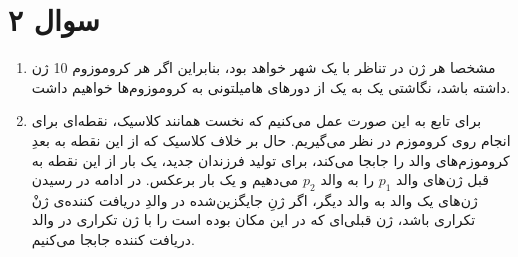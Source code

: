 \documentclass[a4paper, 12pt]{article}
\begin{document}
\section*{سوال ۲}
\begin{enumerate}[آ)]
	\item
	مشخصا هر ژن در تناظر با یک شهر خواهد بود، بنابراین اگر هر کروموزوم 10 ژن داشته باشد، نگاشتی یک به یک از دورهای هامیلتونی به کروموزوم‌ها خواهیم داشت.
	\item {}
	برای تابع  به این صورت عمل می‌کنیم که نخست همانند  کلاسیک، نقطه‌ای برای انجام  روی کروموزم در نظر می‌گیریم. حال بر خلاف  کلاسیک که از این نقطه به بعدِ کروموزم‌های والد را جابجا می‌کند، برای تولید فرزندان جدید، یک بار از این نقطه به قبل ژن‌های والد $p_1$ را به والد $p_2$ می‌دهیم و یک بار برعکس. در ادامه در رسیدن ژن‌های یک والد به والد دیگر، اگر ژنِ جایگزین‌شده در والدِ دریافت کننده‌ی ژنْ تکراری باشد، ژن قبلی‌ای که در این مکان بوده است را با ژن تکراری در والد دریافت‌ کننده جابجا می‌کنیم.
	

\end{enumerate}
\end{document}
